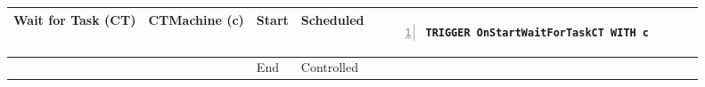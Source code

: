 \begin{tabular}{@{}>{\raggedright\arraybackslash}p{1.5cm}>{\raggedright\arraybackslash}p{2.1cm}>{\raggedright\arraybackslash}p{0.9cm}>{\raggedright\arraybackslash}p{2.2cm}>{\raggedright\arraybackslash}p{8cm}@{}}
  \\ \midrule
  Wait for Task (CT) & CTMachine (c)  & Start & Scheduled  &
  \vspace{-12pt}
  \begin{Verbatim}[numbers=left]
TRIGGER OnStartWaitForTaskCT WITH c
  \end{Verbatim}
  \\ \cmidrule{3-5}
                    &              & End   & Controlled &
  \\ \bottomrule
  \end{tabular}